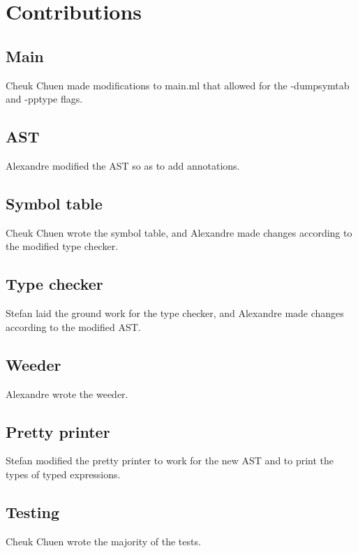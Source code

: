 \documentclass{article}
\begin{document}
\section*{Contributions}
\subsection*{Main}
Cheuk Chuen made modifications to main.ml that allowed for the -dumpsymtab and -pptype flags.

\subsection*{AST}
Alexandre modified the AST so as to add annotations.

\subsection*{Symbol table}
Cheuk Chuen wrote the symbol table, and Alexandre made changes according to the modified type checker.

\subsection*{Type checker}
Stefan laid the ground work for the type checker, and Alexandre made changes according to the modified AST.

\subsection*{Weeder}
Alexandre wrote the weeder.

\subsection*{Pretty printer}
Stefan modified the pretty printer to work for the new AST and to print the types of typed expressions.

\subsection*{Testing}
Cheuk Chuen wrote the majority of the tests.
\end{document}
